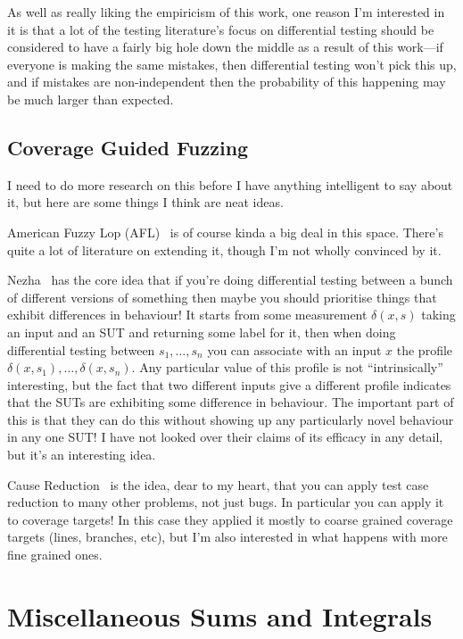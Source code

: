 \documentclass[a4paper]{book}
\begin{document}
As well as really liking the empiricism of this work,
one reason I'm interested in it is that a lot of the testing literature's focus on differential testing should be considered to have a fairly big hole down the middle as a result of this work---if everyone is making the same mistakes,
then differential testing won't pick this up,
and if mistakes are non-independent then the probability of this happening may be much larger than expected.

\section{Coverage Guided Fuzzing}

I need to do more research on this before I have anything intelligent to say about it,
but here are some things I think are neat ideas.

American Fuzzy Lop (AFL)~\cite{AFL} is of course kinda a big deal in this space.
There's quite a lot of literature on extending it,
though I'm not wholly convinced by it.

Nezha~\cite{DBLP:conf/sp/PetsiosTSKJ17} has the core idea that if you're doing differential testing between a bunch of different versions of something then maybe you should prioritise things that exhibit differences in behaviour!
It starts from some measurement \(\delta(x, s)\) taking an input and an SUT and returning some label for it,
then when doing differential testing between \(s_1, \ldots, s_n\) you can associate with an input \(x\) the profile \(\delta(x, s_1), \ldots, \delta(x, s_n)\).
Any particular value of this profile is not ``intrinsically'' interesting,
but the fact that two different inputs give a different profile indicates that the SUTs are exhibiting some difference in behaviour.
The important part of this is that they can do this without showing up any particularly novel behaviour in any one SUT!\@
I have not looked over their claims of its efficacy in any detail,
but it's an interesting idea.

Cause Reduction~\cite{DBLP:journals/stvr/GroceAZCR16} is the idea,
dear to my heart,
that you can apply test case reduction to many other problems,
not just bugs.
In particular you can apply it to coverage targets!
In this case they applied it mostly to coarse grained coverage targets (lines, branches, etc),
but I'm also interested in what happens with more fine grained ones.

\chapter{Miscellaneous Sums and Integrals}
\end{document}
